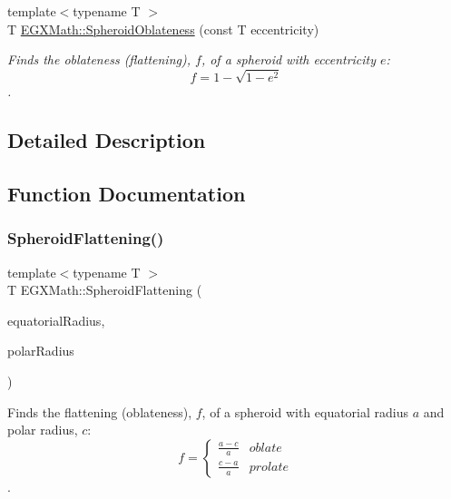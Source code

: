 \begin{DoxyCompactItemize}
{\footnotesize template$<$typename T $>$ }\\T \mbox{\hyperlink{group___e_g_x_math-_geometry-3_d-_spheroid-_flattening_ga486adfc58b047197daf87f50b2039ca7}{E\+G\+X\+Math\+::\+Spheroid\+Oblateness}} (const T eccentricity)
\begin{DoxyCompactList}\small\item\em Finds the oblateness (flattening), $f$, of a spheroid with eccentricity $e$\+: \[ f = 1 - \sqrt{1-e^2} \]. \end{DoxyCompactList}\end{DoxyCompactItemize}


\subsection{Detailed Description}


\subsection{Function Documentation}
\mbox{\label{group___e_g_x_math-_geometry-3_d-_spheroid-_flattening_ga640f4bcd86aa4c378819bffda31c0852}} 
\subsubsection{\texorpdfstring{Spheroid\+Flattening()}{SpheroidFlattening()}\hspace{0.1cm}{\footnotesize\ttfamily [1/2]}}
{\footnotesize\ttfamily template$<$typename T $>$ \\
T E\+G\+X\+Math\+::\+Spheroid\+Flattening (\begin{DoxyParamCaption}\item[{const T}]{equatorial\+Radius,  }\item[{const T}]{polar\+Radius }\end{DoxyParamCaption})}



Finds the flattening (oblateness), $f$, of a spheroid with equatorial radius $a$ and polar radius, $c$\+: \[ f =\begin{cases} \frac{a-c}{a}{} & oblate \\ \frac{c-a}{a} & prolate \end{cases} \]. 

